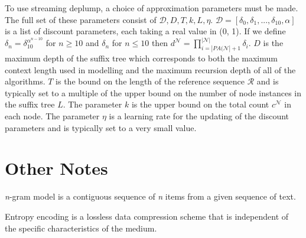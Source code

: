 To use streaming deplump, a choice of approximation parameters must be made. The full set of these parameters consist of $\mathcal{D}, D, T, k, L, \eta$. $\mathcal{D} = [\delta_{0}, \delta_{1}, ..., \delta_{10}, \alpha]$ is a list of discount parameters, each taking a real value in (0, 1). If we define $\delta_{n}=\delta_{10}^{\alpha^{n-10}}$ for $n\geq 10$ and $\delta_{n}$ for $n\leq 10$ then $d^{\mathcal{N}}=\prod_{i=|PA(\mathcal{N}|+1}^{|\mathcal{N}|}\delta_{i}$. $D$ is the maximum depth of the suffix tree which corresponds to both the maximum context length used in modelling and the maximum recursion depth of all of the algorithms. $T$ is the bound on the length of the reference sequence $\mathcal{R}$ and is typically set to a multiple of the upper bound on the number of node instances in the suffix tree $L$. The parameter $k$ is the upper bound on the total count $c^{\mathcal{N}}$ in each node. The parameter $\eta$ is a learning rate for the updating of the discount parameters and is typically set to a very small value.

\section{Other Notes}

\textit{n}-gram model is a contiguous sequence of \textit{n} items from a given sequence of text.

\null
\noindent Entropy encoding is a lossless data compression scheme that is independent of the specific characteristics of the medium.

